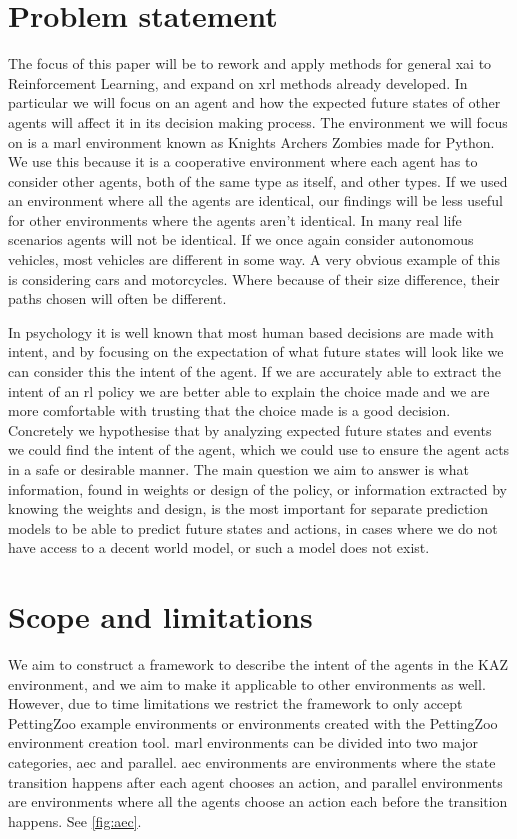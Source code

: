 \documentclass[UKenglish]{uiomasterthesis}
\begin{document}
\section{Problem statement}
\label{sec:problem}
The focus of this paper will be to rework and apply methods for general \ac{xai} to Reinforcement Learning, and expand on \ac{xrl} methods already developed. In particular we will focus on an agent and how the expected future states of other agents will affect it in its decision making process. The environment we will focus on is a \ac{marl} environment known as Knights Archers Zombies \cite{KAZ} made for Python. We use this because it is a cooperative environment where each agent has to consider other agents, both of the same type as itself, and other types. If we used an environment where all the agents are identical, our findings will be less useful for other environments where the agents aren't identical. In many real life scenarios agents will not be identical. If we once again consider autonomous vehicles, most vehicles are different in some way. A very obvious example of this is considering cars and motorcycles. Where because of their size difference, their paths chosen will often be different.

In psychology it is well known that most human based decisions are made with intent\cite{inbook}, and by focusing on the expectation of what future states will look like we can consider this the intent of the agent. If we are accurately able to extract the intent of an \ac{rl} policy we are better able to explain the choice made and we are more comfortable with trusting that the choice made is a good decision. Concretely we hypothesise that by analyzing expected future states and events we could find the intent of the agent, which we could use to ensure the agent acts in a safe or desirable manner. The main question we aim to answer is what information, found in weights or design of the policy, or information extracted by knowing the weights and design, is the most important for separate prediction models to be able to predict future states and actions, in cases where we do not have access to a decent world model, or such a model does not exist.


\section{Scope and limitations}
We aim to construct a framework to describe the intent of the agents in the KAZ environment, and we aim to make it applicable to other environments as well. However, due to time limitations we restrict the framework to only accept PettingZoo example environments or environments created with the PettingZoo environment creation tool. \ac{marl} environments can be divided into two major categories, \ac{aec} and parallel. \ac{aec} environments are environments where the state transition happens after each agent chooses an action, and parallel environments are environments where all the agents choose an action each before the transition happens. See \cref{fig:aec}.
\end{document}
